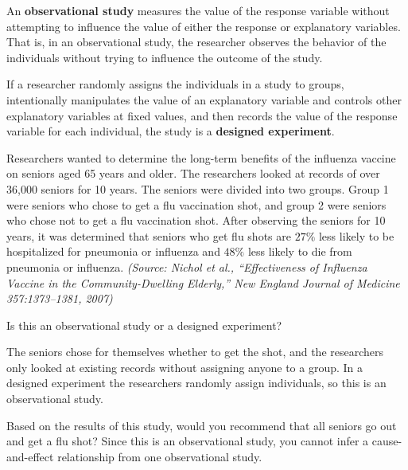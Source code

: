 \documentclass{ximera}
\begin{document}
\begin{definition}
An \textbf{observational study} measures the value of the response variable without attempting to influence the value of either the response or explanatory variables. That is, in an observational study, the researcher observes the behavior of the individuals without trying to influence the outcome of the study.

If a researcher randomly assigns the individuals in a study to groups, intentionally manipulates the value of an explanatory variable and controls other explanatory variables at fixed values, and then records the value of the response variable for each individual, the study is a \textbf{designed experiment}.
\end{definition}

\begin{example}
Researchers wanted to determine the long-term benefits of the influenza vaccine on seniors aged 65 years and older. The researchers looked at records of over 36,000 seniors for 10 years. The seniors were divided into two groups. Group 1 were seniors who chose to get a flu vaccination shot, and group 2 were seniors who chose not to get a flu vaccination shot. After observing the seniors for 10 years, it was determined that seniors who get flu shots are $27\%$ less likely to be hospitalized for pneumonia or influenza and $48\%$ less likely to die from pneumonia or influenza. \emph{(Source: Nichol et al., ``Effectiveness of Influenza Vaccine in the Community-Dwelling Elderly,'' New England Journal of Medicine 357:1373--1381, 2007)}

\begin{problem}
Is this an observational study or a designed experiment?
\begin{multipleChoice}
\end{multipleChoice}
\begin{explanation}
The seniors chose for themselves whether to get the shot, and the researchers only looked at existing records without assigning anyone to a group. In a designed experiment the researchers randomly assign individuals, so this is an observational study.
\end{explanation}
\end{problem}

Based on the results of this study, would you recommend that all seniors go out and get a flu shot? Since this is an observational study, you cannot infer a cause-and-effect relationship from one observational study.
\end{example}
\end{document}
